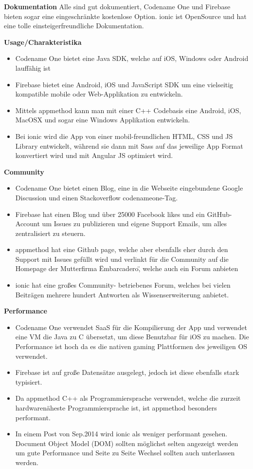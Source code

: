 \textbf{Dokumentation}
Alle sind gut dokumentiert, Codename One und Firebase bieten sogar eine eingeschränkte kostenlose Option.
ionic ist OpenSource und hat eine tolle einsteigerfreundliche Dokumentation.

\textbf{Usage/Charakteristika}
\begin{itemize}
\item Codename One bietet eine Java SDK, welche auf iOS, Windows oder Android lauffähig ist
\item Firebase bietet eine Android, iOS und JavaScript SDK um eine vielseitig kompatible mobile oder Web-Applikation zu entwickeln. 
\item Mittels appmethod kann man mit einer C++ Codebasis eine Android, iOS, MacOSX und sogar eine Windows Applikation entwickeln.
\item Bei ionic wird die App von einer mobil-freundlichen HTML, CSS und JS Library entwickelt, während sie dann mit Sass auf das jeweilige App Format konvertiert wird und mit Angular JS optimiert wird. 
\end{itemize}
\clearpage

\textbf{Community}
\begin{itemize}
\item Codename One bietet einen Blog, eine in die Webseite eingebundene Google Discussion und einen Stackoverflow codenameone-Tag.
\item Firebase hat einen Blog und über 25000 Facebook likes und ein GitHub-Account um Issues zu publizieren und eigene Support Emails, um alles zentralisiert zu steuern. 
\item appmethod hat eine Github page, welche aber ebenfalls eher durch den Support mit Issues gefüllt wird und verlinkt für die Community auf die Homepage der Mutterfirma \"Embarcadero\", welche auch ein Forum anbieten
\item ionic hat eine großes Community- betriebenes Forum, welches bei vielen Beiträgen mehrere hundert Antworten als Wissenserweiterung anbietet.
\end{itemize}

\textbf{Performance}
\begin{itemize}
\item Codename One verwendet SaaS für die Kompilierung der App und verwendet eine VM die Java zu C übersetzt, um diese Benutzbar für iOS zu machen. Die Performance ist hoch da es die nativen gaming Plattformen des jeweiligen OS verwendet. 
\item Firebase ist auf große Datensätze ausgelegt, jedoch ist diese ebenfalls stark typisiert.
\item Da appmethod C++ als Programmiersprache verwendet, welche die zurzeit hardwarenäheste Programmiersprache ist, ist appmethod besonders performant.
\item In einem Post von Sep.2014 wird ionic als weniger performant gesehen. Document Object Model (DOM) sollten möglichst selten angezeigt werden um gute Performance und Seite zu Seite Wechsel sollten auch unterlassen werden.
\end{itemize}

